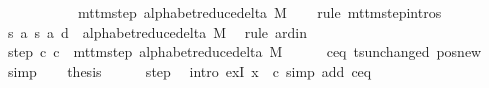 \begin{isabellebody}
\ \ \ \ \ \ \ \ \ \ {\isasymin}\ mttm{\isacharunderscore}{\kern0pt}step\ {\isacharparenleft}{\kern0pt}alphabet{\isacharunderscore}{\kern0pt}reduce{\isacharunderscore}{\kern0pt}delta\ M{\isacharparenright}{\kern0pt}{\isachardoublequoteclose}\isanewline
\ \ \isamarkupfalse%
\ {\isacharparenleft}{\kern0pt}rule\ mttm{\isacharunderscore}{\kern0pt}step{\isachardot}{\kern0pt}intros{\isacharparenright}{\kern0pt}\isanewline
\ \ \ \ \isamarkupfalse%
\ {\isachardoublequoteopen}{\isacharparenleft}{\kern0pt}{\isacharquery}{\kern0pt}s{\isacharcomma}{\kern0pt}\ {\isacharquery}{\kern0pt}a{\isacharcomma}{\kern0pt}\ {\isacharquery}{\kern0pt}s{\isacharprime}{\kern0pt}{\isacharcomma}{\kern0pt}\ {\isacharquery}{\kern0pt}a{\isacharcomma}{\kern0pt}\ {\isacharquery}{\kern0pt}d{\isacharparenright}{\kern0pt}\ {\isasymin}\ alphabet{\isacharunderscore}{\kern0pt}reduce{\isacharunderscore}{\kern0pt}delta\ M{\isachardoublequoteclose}\ \isamarkupfalse%
\ {\isacharparenleft}{\kern0pt}rule\ ard{\isacharunderscore}{\kern0pt}in{\isacharparenright}{\kern0pt}\isanewline
\ \ \isamarkupfalse%
\isanewline
\ \ \isamarkupfalse%
\ step{\isacharcolon}{\kern0pt}\ {\isachardoublequoteopen}{\isacharparenleft}{\kern0pt}c{\isacharprime}{\kern0pt}{\isacharcomma}{\kern0pt}\ {\isacharquery}{\kern0pt}c{\isacharprime}{\kern0pt}{\isacharprime}{\kern0pt}{\isacharparenright}{\kern0pt}\ {\isasymin}\ mttm{\isacharunderscore}{\kern0pt}step\ {\isacharparenleft}{\kern0pt}alphabet{\isacharunderscore}{\kern0pt}reduce{\isacharunderscore}{\kern0pt}delta\ M{\isacharparenright}{\kern0pt}{\isachardoublequoteclose}\isanewline
\ \ \ \ \isamarkupfalse%
\ c{\isacharprime}{\kern0pt}{\isacharunderscore}{\kern0pt}eq\ ts{\isacharunderscore}{\kern0pt}unchanged\ pos{\isacharunderscore}{\kern0pt}new\ \isamarkupfalse%
\ simp\isanewline
\ \ \isamarkupfalse%
\ {\isacharquery}{\kern0pt}thesis\isanewline
\ \ \ \ \isamarkupfalse%
\ step\ \isamarkupfalse%
\ {\isacharparenleft}{\kern0pt}intro\ exI{\isacharbrackleft}{\kern0pt}\ x\ {\isacharequal}{\kern0pt}\ {\isacharquery}{\kern0pt}c{\isacharprime}{\kern0pt}{\isacharprime}{\kern0pt}{\isacharbrackright}{\kern0pt}{\isacharparenright}{\kern0pt}\ {\isacharparenleft}{\kern0pt}simp\ add{\isacharcolon}{\kern0pt}\ c{\isacharprime}{\kern0pt}{\isacharunderscore}{\kern0pt}eq{\isacharparenright}{\kern0pt}\isanewline
{}\isamarkupfalse%
%
\endisatagproof
{\isafoldproof}%

\end{isabellebody}
